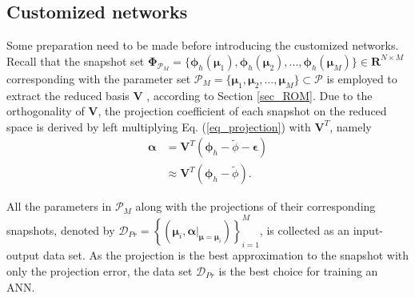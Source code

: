 \documentclass[preprint, 10pt]{elsarticle}
\begin{document}
\subsection{Customized networks}

Some preparation need to be made before introducing the customized networks. Recall that the snapshot set $\pmb {\Phi}_{\mathcal{P}_M}=\{\pmb{\phi}_h(\pmb{\mu}_1), \pmb{\phi}_h(\pmb{\mu}_2),...,\pmb{\phi}_h(\pmb{\mu}_M)\}  \in \mathbf{R}^{N \times M}$ corresponding with the parameter set $\mathcal{P}_M=\{\pmb{\mu}_1, \pmb{\mu}_2,...,\pmb{\mu}_M\} \subset \mathcal{P}$ is employed to extract the reduced basis $\mathbf{V}$ , according to Section \ref{sec_ROM}. Due to the orthogonality of $\mathbf{V}$, the projection coefficient of each snapshot on the reduced space is derived by left multiplying Eq. (\ref{eq_projection}) with $\mathbf{V}^T$, namely
\begin{equation}
\begin{aligned}
\pmb{\alpha}  &   =    \mathbf{V}^T (\pmb{\phi}_h -\tilde{\phi} - \pmb{\epsilon}) \\
              &\approx \mathbf{V}^T (\pmb{\phi}_h -\tilde{\phi})
.
\end{aligned}
\label{eq_RBCoefficients}
\end{equation}

All the parameters in $\mathcal{P}_M$ along with the projections of their corresponding snapshots, denoted by $\mathcal{D}_{Pr}=\left\{\left(\pmb{\mu}_i, \left. {\pmb{\alpha}} \right|_{\pmb{\mu}=\pmb{\mu}_i}
\right) \right\}_{i=1}^{M}$,  is collected as an input-output data set. As the projection is the best approximation to the snapshot with only the projection error, the data set $\mathcal{D}_{Pr}$ is the best choice for training an ANN.
\end{document}
